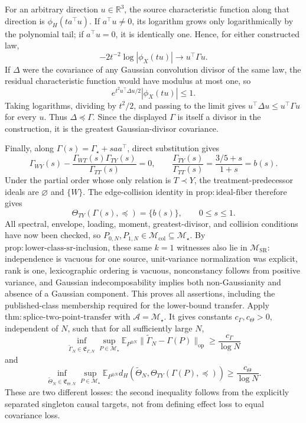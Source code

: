 For an arbitrary direction \(u\in\mathbb R^3\), the source characteristic function along that direction is \(\phi_H(ta^\top u)\).  If \(a^\top u\ne0\), its logarithm grows only logarithmically by the polynomial tail; if \(a^\top u=0\), it is identically one.  Hence, for either constructed law,
\[
 -2t^{-2}\log|\phi_X(tu)|\longrightarrow u^\top\Gamma u.
\]
If \(\Delta\) were the covariance of any Gaussian convolution divisor of the same law, the residual characteristic function would have modulus at most one, so
\[
 e^{t^2u^\top\Delta u/2}|\phi_X(tu)|\le1.
\]
Taking logarithms, dividing by \(t^2/2\), and passing to the limit gives \(u^\top\Delta u\le u^\top\Gamma u\) for every \(u\).  Thus \(\Delta\preceq\Gamma\).  Since the displayed \(\Gamma\) is itself a divisor in the construction, it is the greatest Gaussian-divisor covariance.

Finally, along \(\Gamma(s)=\Gamma_\star+saa^\top\), direct substitution gives
\[
 \Gamma_{WY}(s)-\frac{\Gamma_{WT}(s)\Gamma_{TY}(s)}{\Gamma_{TT}(s)}=0,
 \qquad
 \frac{\Gamma_{TY}(s)}{\Gamma_{TT}(s)}
 =\frac{3/5+s}{1+s}=b(s).
\]
Under the partial order whose only relation is \(T\prec Y\), the treatment-predecessor ideals are \(\varnothing\) and \(\{W\}\).  The edge-collision identity in \(\mathrm{prop:ideal\text{-}fiber}\) therefore gives
\[
 \Theta_{TY}(\Gamma(s),\preceq)=\{b(s)\},
 \qquad 0\le s\le1.
\]
All spectral, envelope, loading, moment, greatest-divisor, and collision conditions have now been checked, so \(P_{0,N},P_{1,N}\in\mathcal M_{\mathrm{col}}\subseteq\mathcal M_\star\).  By \(\mathrm{prop:lower\text{-}class\text{-}sr\text{-}inclusion}\), these same \(k=1\) witnesses also lie in \(\mathcal M_{\mathrm{SR}}\): independence is vacuous for one source, unit-variance normalization was explicit, rank is one, lexicographic ordering is vacuous, nonconstancy follows from positive variance, and Gaussian indecomposability implies both non-Gaussianity and absence of a Gaussian component.  This proves all assertions, including the published-class membership required for the lower-bound transfer.
Apply \(\mathrm{thm:splice\text{-}two\text{-}point\text{-}transfer}\) with \(\mathcal A=\mathcal M_\star\).  It gives constants \(c_\Gamma,c_\Theta>0\), independent of \(N\), such that for all sufficiently large \(N\),
\[
 \inf_{\widetilde\Gamma_N\in\mathfrak E_{\Gamma,N}}
 \sup_{P\in\mathcal M_\star}
 \mathbb E_{P^{\otimes N}}\|\widetilde\Gamma_N-\Gamma(P)\|_{\mathrm{op}}
 \ge\frac{c_\Gamma}{\log N}
\]
and
\[
 \inf_{\widetilde\Theta_N\in\mathfrak E_{\Theta,N}}
 \sup_{P\in\mathcal M_\star}
 \mathbb E_{P^{\otimes N}}
 d_H\!\left(\widetilde\Theta_N,\Theta_{TY}(\Gamma(P),\preceq)\right)
 \ge\frac{c_\Theta}{\log N}.
\]
These are two different losses: the second inequality follows from the explicitly separated singleton causal targets, not from defining effect loss to equal covariance loss.

